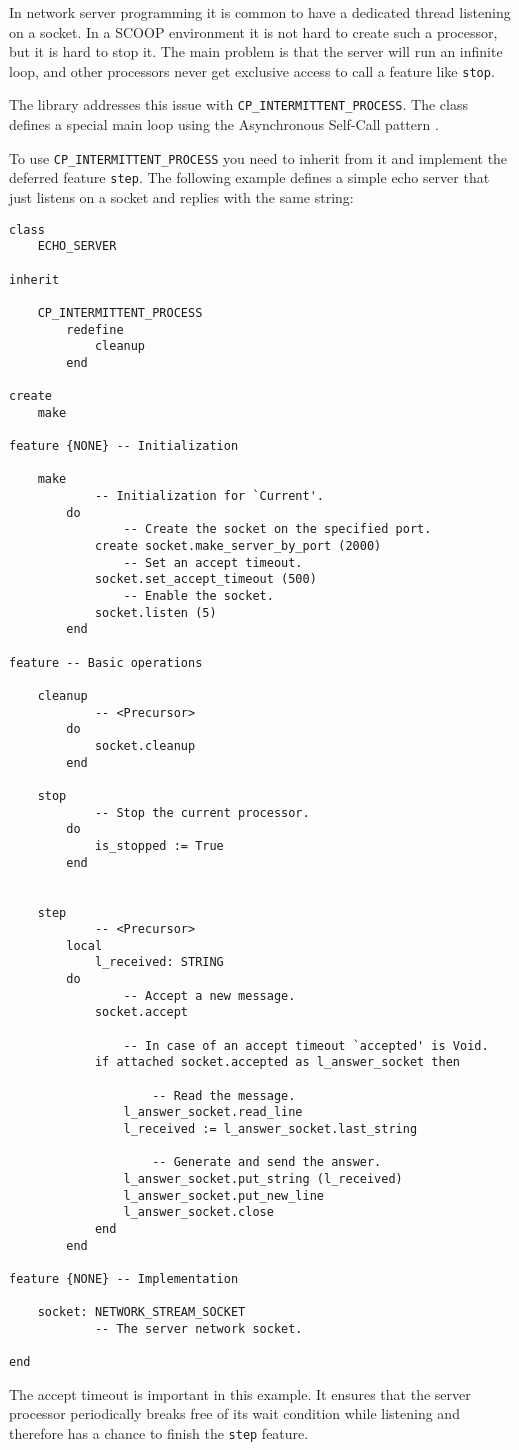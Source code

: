 In network server programming it is common to have a dedicated thread listening on a socket.
In a SCOOP environment it is not hard to create such a processor, but it is hard to stop it.
The main problem is that the server will run an infinite loop, and other processors never get exclusive access to call a feature like \lstinline!stop!.

The library addresses this issue with \lstinline!CP_INTERMITTENT_PROCESS!.
The class defines a special main loop using the Asynchronous Self-Call pattern .

To use \lstinline!CP_INTERMITTENT_PROCESS! you need to inherit from it and implement the deferred feature \lstinline!step!.
The following example defines a simple echo server that just listens on a socket and replies with the same string:

\begin{lstlisting}[language=OOSC2Eiffel, captionpos=b, caption={The echo server class.}]
class
	ECHO_SERVER

inherit

	CP_INTERMITTENT_PROCESS
		redefine
			cleanup
		end

create
	make

feature {NONE} -- Initialization

	make
			-- Initialization for `Current'.
		do
				-- Create the socket on the specified port.
			create socket.make_server_by_port (2000)
				-- Set an accept timeout.
			socket.set_accept_timeout (500)
				-- Enable the socket.
			socket.listen (5)
		end

feature -- Basic operations

	cleanup
			-- <Precursor>
		do
			socket.cleanup
		end

	stop
			-- Stop the current processor.
		do
			is_stopped := True
		end

		
	step
			-- <Precursor>
		local
			l_received: STRING
		do
				-- Accept a new message.
			socket.accept
			
				-- In case of an accept timeout `accepted' is Void.
			if attached socket.accepted as l_answer_socket then

					-- Read the message.
				l_answer_socket.read_line
				l_received := l_answer_socket.last_string

					-- Generate and send the answer.
				l_answer_socket.put_string (l_received)
				l_answer_socket.put_new_line
				l_answer_socket.close
			end
		end

feature {NONE} -- Implementation

	socket: NETWORK_STREAM_SOCKET
			-- The server network socket.

end
\end{lstlisting}
The accept timeout is important in this example.
It ensures that the server processor periodically breaks free of its wait condition while listening and therefore has a chance to finish the \lstinline!step! feature.

